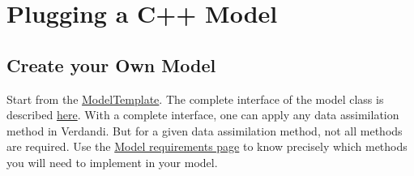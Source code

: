 \documentclass{tufte-book}
\begin{document}
\hypertarget{plugging_model}{}\section{\-Plugging a C++ Model}\label{plugging_model}

\hypertarget{plugging_model_own_model}{}\subsection{\-Create your Own Model}\label{plugging_model_own_model}
\-Start from the {\ttfamily  \hyperlink{model_template}{\-Model\-Template}}. \-The complete interface of the model class is described {\ttfamily  \hyperlink{model_template}{here}}. With a complete interface, one can apply any data assimilation method in Verdandi. But for a given data assimilation method, not all methods are required. Use the \hyperlink{model_requirement_page}{\-Model requirements page} to know precisely which methods you will need to implement in your model.
\end{document}
